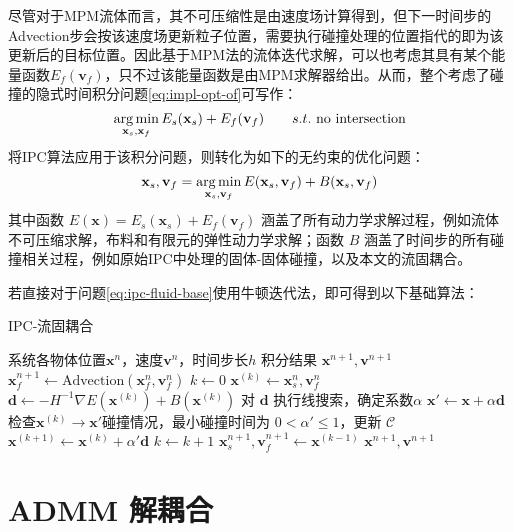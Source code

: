 尽管对于MPM流体而言，其不可压缩性是由速度场计算得到，但下一时间步的Advection步会按该速度场更新粒子位置，需要执行碰撞处理的位置指代的即为该更新后的目标位置。因此基于MPM法的流体迭代求解，可以也考虑其具有某个能量函数$E_f(\mathbf v_f)$，只不过该能量函数是由MPM求解器给出。从而，整个考虑了碰撞的隐式时间积分问题\ref{eq:impl-opt-of}可写作：
\begin{equation}
  \mathop{\arg\min}\limits_{\mathbf x_s, \mathbf x_f} E_s(\mathbf x_s) + E_f(\mathbf v_f)\qquad s.t.\text{ no intersection}
\end{equation}
将IPC算法应用于该积分问题，则转化为如下的无约束的优化问题：
\begin{equation}\label{eq:ipc-fluid-base}
  \mathbf x_s, \mathbf v_f =  \mathop{\arg\min}\limits_{\mathbf x_s, \mathbf v_f} E(\mathbf x_s, \mathbf v_f) + B(\mathbf x_s, \mathbf v_f)
\end{equation}
其中函数 $E(\mathbf x) = E_s(\mathbf x_s) + E_f(\mathbf v_f)$ 涵盖了所有动力学求解过程，例如流体不可压缩求解，布料和有限元的弹性动力学求解；函数 $B$ 涵盖了时间步的所有碰撞相关过程，例如原始IPC中处理的固体-固体碰撞，以及本文的流固耦合。

若直接对于问题\ref{eq:ipc-fluid-base}使用牛顿迭代法，即可得到以下基础算法：
\begin{algorithm}[H]
  \caption{IPC-流固耦合}\label{alg:ipc-fluid-base}
  \begin{algorithmic}[1]
    \label{algo:mpm-time-integration}
    \Require 系统各物体位置$\mathbf x^n$，速度$\mathbf v^n$，时间步长$h$
    \Ensure 积分结果 $\mathbf x^{n+1}, \mathbf v^{n+1}$
    \State $\mathbf x^{n+1}_{f} \leftarrow \mathrm{Advection} (\mathbf x^{n}_{f}, \mathbf v^{n}_f)$
    \State $k\leftarrow 0$
    \State $\mathbf x^{(k)} \leftarrow {\mathbf x^n_s, \mathbf v^n_f}$
      \State $\mathbf d \leftarrow -H^{-1} \nabla E(\mathbf x^{(k)}) + B(\mathbf x^{(k)})$
      \State 对 $\mathbf d$ 执行线搜索，确定系数$\alpha$
      \State $\mathbf x'\leftarrow \mathbf x + \alpha \mathbf d$
      \State 检查$\mathbf x^{(k)} \rightarrow \mathbf x'$碰撞情况，最小碰撞时间为 $ 0 < \alpha' \le 1$，更新 $\mathcal C$
      \State $\mathbf x^{(k+1)} \leftarrow \mathbf x^{(k)} + \alpha' \mathbf d$
      \State $k\leftarrow k + 1$ 
    \EndWhile
    \State ${\mathbf x^{n+1}_s, \mathbf v^{n+1}_f} \leftarrow\mathbf x^{(k-1)}$
    \State \Return $\mathbf x^{n+1}, \mathbf v^{n+1}$
  \end{algorithmic}
\end{algorithm}

\section{ADMM 解耦合}

